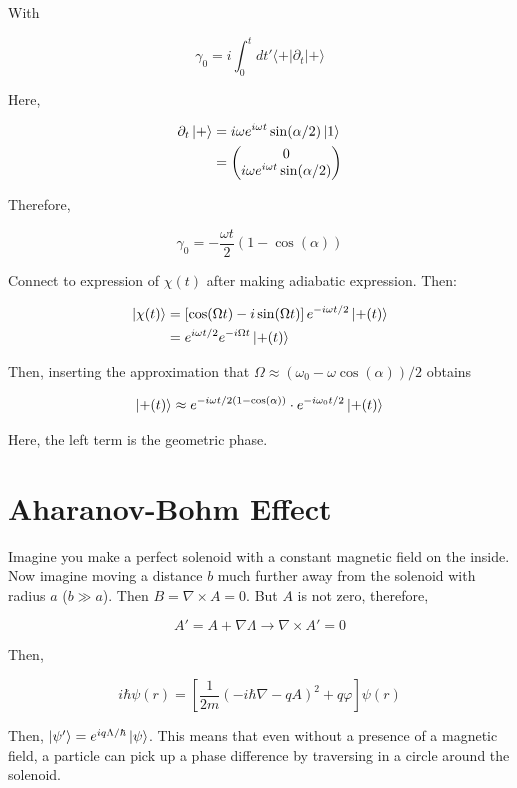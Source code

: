\documentclass{article}
\newtheorem{one minute paper}[theorem]{One Minute Paper}
\begin{document}
With 

\begin{equation}
    \gamma_0 = i\int_{0}^t dt' \langle + | \partial_{t} | + \rangle
\end{equation}

Here, 

\begin{align*}
    \partial_{t}\ket{+} &= i\omega e^{i \omega t}\sin(\alpha/2)\ket{1} \\
    &= \begin{pmatrix}
        0 \\
        i\omega e^{i \omega t}\sin(\alpha/2)
    \end{pmatrix}
\end{align*}

Therefore, 

\begin{equation}
    \gamma_0 = -\frac{\omega t}{2}\left( 1 - \cos(\alpha) \right)
\end{equation}

Connect to expression of $\chi(t)$ after making adiabatic expression. Then: 

\begin{align*}
    \ket{\chi(t)} &= \left[ \cos(\Omega t) - i \sin(\Omega t) \right]e^{-i \omega t/2}\ket{+(t)} \\
    &= e^{i \omega t/2}e^{-i \Omega t}\ket{+(t)}
\end{align*}

Then, inserting the approximation that $\Omega \approx (\omega_0 - \omega\cos(\alpha))/2$ obtains 

\begin{equation}
    \ket{+(t)}\approx e^{-i\omega t/2\left( 1 - \cos(\alpha) \right)}\cdot e^{-i\omega_0 t/2}\ket{+(t)}
\end{equation}

Here, the left term is the geometric phase. 

\section*{Aharanov-Bohm Effect}

Imagine you make a perfect solenoid with a constant magnetic field on the inside. Now imagine moving a distance $b$ much further away from the
solenoid with radius $a$ ($b \gg a$). Then $B = \nabla \times A = 0$. But $A$ is not zero, therefore, 

\begin{equation}
    A' = A + \nabla \Lambda \rightarrow \nabla \times A' = 0
\end{equation}

Then, 

\begin{equation}
    i \hbar \psi(r) = \left[ \frac{1}{2m}\left( -i \hbar \nabla - qA \right)^2 + q\varphi \right]\psi(r)
\end{equation}

Then, $\ket{\psi'} = e^{iq\Lambda/\hbar}\ket{\psi}$. This means that even without a presence of a magnetic field, a particle can pick up a phase difference by traversing in a circle around the solenoid. 
\end{document}
